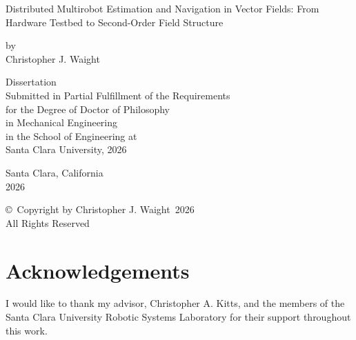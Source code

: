 \documentclass[12pt, letterpaper, oneside]{report}
\newcommand{\thesistitle}{Distributed Multirobot Estimation and Navigation in Vector Fields: From Hardware Testbed to Second-Order Field Structure}
\newcommand{\thesisauthor}{Christopher J. Waight}
\newcommand{\thesisdegreefield}{Mechanical Engineering}
\newcommand{\thesisyear}{2026}
\begin{document}
\begin{titlepage}
\begin{center}
  \vspace*{1in}

  {\Large \thesistitle}

  \vspace{0.6in}
  by \\[6pt]
  \thesisauthor

  \vspace{1.2in}
  Dissertation \\[6pt]
  Submitted in Partial Fulfillment of the Requirements \\
  for the Degree of Doctor of Philosophy \\
  in \thesisdegreefield \\[6pt]
  in the School of Engineering at \\
  Santa Clara University, \thesisyear

  \vspace{1in}
  Santa Clara, California \\
  \thesisyear
\end{center}
\end{titlepage}

\clearpage
\thispagestyle{plain}
\vspace*{3in}
\begin{center}
  \copyright\ Copyright by \thesisauthor\ \thesisyear \\
  All Rights Reserved
\end{center}
\clearpage

\chapter*{Acknowledgements}


I would like to thank my advisor, Christopher A. Kitts, and the members of
the Santa Clara University Robotic Systems Laboratory for their support
throughout this work.
\end{document}
